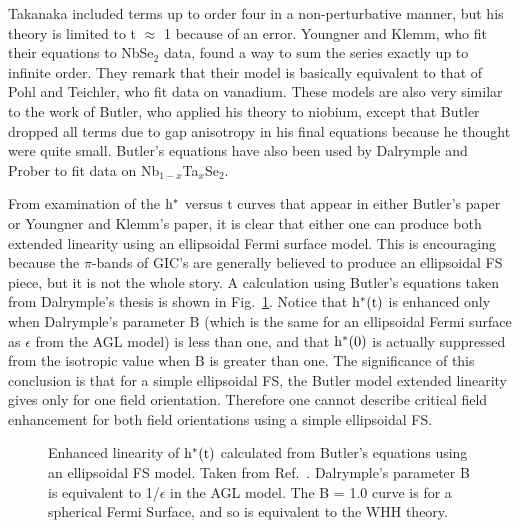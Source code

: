         Takanaka  included  terms up to  order four  in  a non-perturbative
manner,   but his  theory   is limited   to  t $\approx$   1 because of  an
error.\cite{youngner80,ikebe80} Youngner and Klemm, who fit their equations
to  NbSe$_2$ data, found a way  to  sum the  series  exactly up to infinite
order.\cite{youngner80}   They remark   that    their  model  is  basically
equivalent  to  that  of   Pohl   and   Teichler,    who    fit   data   on
vanadium.\cite{pohl76} These models  are also very  similar to  the work of
Butler,\cite{butler80} who applied    his theory  to  niobium, except  that
Butler dropped  all  terms due   to gap anisotropy  in  his final equations
because he thought were quite small.  Butler's equations have also been used
by  Dalrymple  and  Prober\cite{dalrymple84}       to   fit    data      on
Nb$_{1-x}$Ta$_x$Se$_2$.

        From examination of the  $\rm h^*$ versus t curves  that  appear in
either  Butler's    paper\cite{butler80}     or   Youngner   and    Klemm's
paper,\cite{youngner80}  it is clear   that either   one  can produce  both
extended  linearity  using an  ellipsoidal Fermi surface   model.   This is
encouraging  because the  $\pi$-bands of GIC's  are  generally  believed to
produce an ellipsoidal FS piece,\cite{I94} but it  is  not the whole story.
A   calculation  using     Butler's  equations      taken from  Dalrymple's
thesis\cite{dalrymple83} is shown in Fig.~\ref{butlerellipse}.  Notice that
$\rm h^*(t)$ is enhanced only  when  Dalrymple's parameter B  (which is the
same for an ellipsoidal Fermi surface as $\epsilon$ from the  AGL model) is
less than one,   and that $\rm h^*(0)$  is  actually suppressed  from   the
isotropic  value when B is greater  than one.   The   significance  of this
conclusion is that for a simple ellipsoidal  FS,  the Butler model extended
linearity gives only for one field orientation.\cite{dalrymple83} Therefore
one cannot describe critical field enhancement for both  field orientations
using a simple ellipsoidal FS.

\begin{figure}
\vspace{5in}
\caption[Enhanced linearity of $\rm h^*(t)$ calculated from Butler's
equations  using  an  ellipsoidal FS   model.]{Enhanced  linearity of  $\rm
h^*(t)$ calculated    from  Butler's  equations\cite{butler80}    using  an
ellipsoidal  FS  model.  Taken   from Ref.~\cite{dalrymple83}.  Dalrymple's
parameter B is  equivalent to 1/$\epsilon$ in the  AGL model.  The B  = 1.0
curve is for a  spherical Fermi Surface, and  so is equivalent  to  the WHH
theory.}
\label{butlerellipse}
\end{figure}

